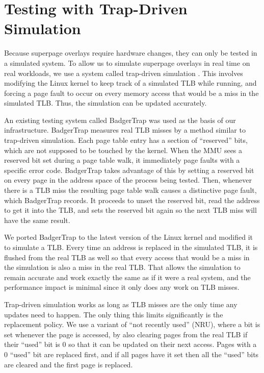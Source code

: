 \chapter{Testing with Trap-Driven Simulation}

Because superpage overlays require hardware changes, they can only be tested in a simulated system. To allow us to simulate superpage overlays in real time on real workloads, we use a system called trap-driven simulation \cite{Talluri}. This involves modifying the Linux kernel to keep track of a simulated TLB while running, and forcing a page fault to occur on every memory access that would be a miss in the simulated TLB. Thus, the simulation can be updated accurately.

An existing testing system called BadgerTrap \cite{BadgerTrap} was used as the basis of our infrastructure. BadgerTrap measures real TLB misses by a method similar to trap-driven simulation. Each page table entry has a section of ``reserved'' bits, which are not supposed to be touched by the kernel. When the MMU sees a reserved bit set during a page table walk, it immediately page faults with a specific error code. BadgerTrap takes advantage of this by setting a reserved bit on every page in the address space of the process being tested. Then, whenever there is a TLB miss the resulting page table walk causes a distinctive page fault, which BadgerTrap records. It proceeds to unset the reserved bit, read the address to get it into the TLB, and sets the reserved bit again so the next TLB miss will have the same result.

We ported BadgerTrap to the latest version of the Linux kernel and modified it to simulate a TLB. Every time an address is replaced in the simulated TLB, it is flushed from the real TLB as well so that every access that would be a miss in the simulation is also a miss in the real TLB. That allows the simulation to remain accurate and work exactly the same as if it were a real system, and the performance impact is minimal since it only does any work on TLB misses.

Trap-driven simulation works as long as TLB misses are the only time any updates need to happen. The only thing this limits significantly is the replacement policy. We use a variant of ``not recently used'' (NRU), where a bit is set whenever the page is accessed, by also clearing pages from the real TLB if their ``used'' bit is 0 so that it can be updated on their next access. Pages with a 0 ``used'' bit are replaced first, and if all pages have it set then all the ``used'' bits are cleared and the first page is replaced.


